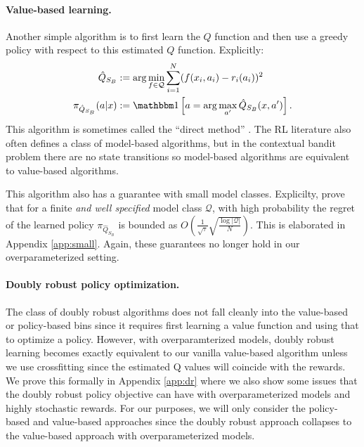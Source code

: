 \paragraph{Value-based learning.}
Another simple algorithm is to first learn the $ Q $ function and then use a greedy policy with respect to this estimated $ Q$ function. Explicitly:
\begin{align}\label{eqn:hatQ}
    \hat Q_{S_B} &:= \arg\min_{f \in \mathcal{Q}} \sum_{i=1}^N (f(x_i, a_i) - r_i(a_i))^2 \\ \pi_{\hat Q_{S_B}}(a|x) &:= \one \left[a = \arg\max_{a'} \hat Q_{S_B}(x, a')\right].
\end{align}
This algorithm is sometimes called the ``direct method'' \citep{dudik2011doubly}.
The RL literature also often defines a class of model-based algorithms, but in the contextual bandit problem there are no state transitions so model-based algorithms are equivalent to value-based algorithms.


This algorithm also has a guarantee with small model classes. Explicilty, \citet{chen2019information} prove that for a finite \emph{and well specified} model class $ \mathcal{Q}$, with high probability the regret of the learned policy $ \pi_{\hat Q_{S_B}}$ is bounded as $ O(\frac{1}{\sqrt{\tau}} \sqrt{\frac{\log |\mathcal{Q}|}{N}})$. This is elaborated in Appendix \ref{app:small}. Again, these guarantees no longer hold in our overparameterized setting.


\paragraph{Doubly robust policy optimization.}

The class of doubly robust algorithms \citep{dudik2011doubly} does not fall cleanly into the value-based or policy-based bins since it requires first learning a value function and using that to optimize a policy. However, with overparamterized models, doubly robust learning becomes exactly equivalent to our vanilla value-based algorithm unless we use crossfitting since the estimated Q values will coincide with the rewards. We prove this formally in Appendix \ref{app:dr} where we also show some issues that the doubly robust policy objective can have with overparameterized models and highly stochastic rewards. For our purposes, we will only consider the policy-based and value-based approaches since the doubly robust approach collapses to the value-based approach with overparameterized models.






